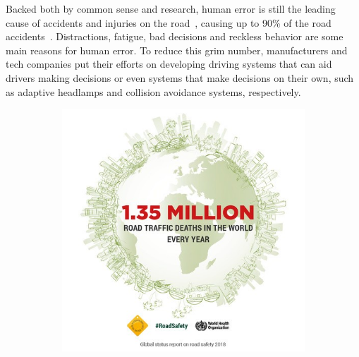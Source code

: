 Backed both by common sense and research, human error is still the leading cause of accidents and injuries on the road~\cite{Bimbraw2015, WHO2018}, causing up to 90\% of the road accidents~\cite{WHO2018}. Distractions, fatigue, bad decisions and reckless behavior are some main reasons for human error. To reduce this grim number, manufacturers and tech companies put their efforts on developing driving systems that can aid drivers making decisions or even systems that make decisions on their own, such as adaptive headlamps and collision avoidance systems, respectively.


\begin{figure}[!ht]
	\centering
	\begin{subfigure}[c]{0.3\textwidth}
		\includegraphics[width=\textwidth]{img/road_safety/1_35-million.jpg}
		\label{fig:test_image_1}
	\end{subfigure}
	\quad
	\begin{subfigure}[c]{0.3\textwidth}

\end{subfigure}
\end{figure}

